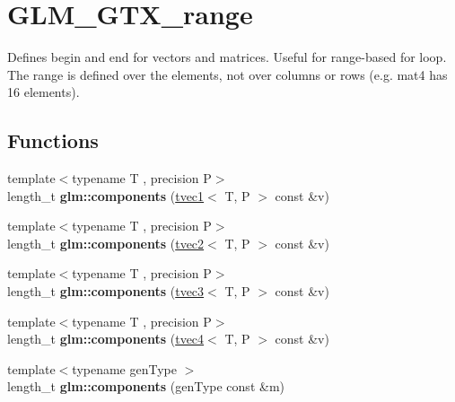 \hypertarget{group__gtx__range}{}\section{G\+L\+M\+\_\+\+G\+T\+X\+\_\+range}
\label{group__gtx__range}


Defines begin and end for vectors and matrices. Useful for range-\/based for loop. The range is defined over the elements, not over columns or rows (e.\+g. mat4 has 16 elements).  


\subsection*{Functions}
\begin{DoxyCompactItemize}
\item 
\mbox{\label{group__gtx__range_gab866f7e9055dafab616eb0fb3ec8d08e}} 
{\footnotesize template$<$typename T , precision P$>$ }\\length\+\_\+t {\bfseries glm\+::components} (\hyperlink{structglm_1_1tvec1}{tvec1}$<$ T, P $>$ const \&v)
\item 
\mbox{\label{group__gtx__range_gaa47e3ca3e374b418523be2898497e20f}} 
{\footnotesize template$<$typename T , precision P$>$ }\\length\+\_\+t {\bfseries glm\+::components} (\hyperlink{structglm_1_1tvec2}{tvec2}$<$ T, P $>$ const \&v)
\item 
\mbox{\label{group__gtx__range_gad1cb57e1fdaf433442f8fcb1811d02bc}} 
{\footnotesize template$<$typename T , precision P$>$ }\\length\+\_\+t {\bfseries glm\+::components} (\hyperlink{structglm_1_1tvec3}{tvec3}$<$ T, P $>$ const \&v)
\item 
\mbox{\label{group__gtx__range_ga8b88772fd866e0bc6e3df7456596ef0e}} 
{\footnotesize template$<$typename T , precision P$>$ }\\length\+\_\+t {\bfseries glm\+::components} (\hyperlink{structglm_1_1tvec4}{tvec4}$<$ T, P $>$ const \&v)
\item 
\mbox{\label{group__gtx__range_ga946358ba868fc33d234e7ee3ac1b7912}} 
{\footnotesize template$<$typename gen\+Type $>$ }\\length\+\_\+t {\bfseries glm\+::components} (gen\+Type const \&m)

\end{DoxyCompactItemize}
